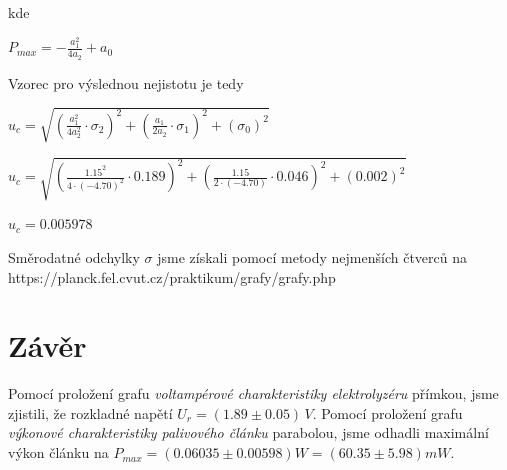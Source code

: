 \documentclass[11pt, a4paper]{report}
\begin{document}
\noindent kde
\begin{center}
	\Large
	$P_{max} = -\frac{a_1^2}{4a_2} + a_0$
\end{center}

Vzorec pro výslednou nejistotu je tedy
\begin{center}
	\Large
	$u_c = \sqrt{(\frac{a_1^2}{4a_2^2} \cdot \sigma_2)^2 + (\frac{a_1}{2a_2} \cdot \sigma_1)^2 + (\sigma_0)^2}$

	\vspace{5pt}
	$u_c = \sqrt{(\frac{1.15^2}{4 \cdot (-4.70)^2} \cdot 0.189)^2 + (\frac{1.15}{2 \cdot (-4.70)} \cdot 0.046)^2 + (0.002)^2}$

	\vspace{5pt}
	$u_c = 0.005978$	
\end{center}
Směrodatné odchylky {\boldmath$\sigma$} jsme získali pomocí metody nejmenších čtverců na https://planck.fel.cvut.cz/praktikum/grafy/grafy.php

\chapter{Závěr}
\large 
Pomocí proložení grafu \emph{voltampérové charakteristiky elektrolyzéru} přímkou, jsme zjistili, že rozkladné napětí $U_r = (1.89 \pm 0.05)\,V$.
\newline
\noindent
Pomocí proložení grafu \emph{výkonové charakteristiky palivového článku} parabolou, jsme odhadli maximální výkon článku na $P_{max} = (0.06035\pm0.00598)W = (60.35\pm5.98)mW$. 
\end{document}

